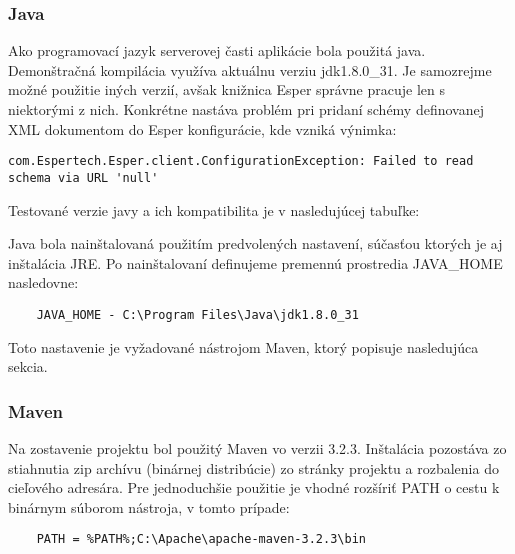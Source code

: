 \subsubsection{Java}	%
	Ako programovací jazyk serverovej časti aplikácie bola použitá java. Demonštračná kompilácia využíva aktuálnu verziu jdk1.8.0\_31. Je samozrejme možné použitie iných verzií, avšak knižnica Esper správne pracuje len s niektorými z nich. Konkrétne nastáva problém pri pridaní schémy definovanej XML dokumentom do Esper konfigurácie, kde vzniká výnimka:
	\begin{lstlisting}[label=lst:exjava,caption=Výnimka pri definovaní XML schémy v niektorých verziách javy]
	com.Espertech.Esper.client.ConfigurationException: Failed to read schema via URL 'null'
	\end{lstlisting}
	
	Testované verzie javy a ich kompatibilita je v nasledujúcej tabuľke:
	
	Java bola nainštalovaná použitím predvolených nastavení, súčasťou ktorých je aj inštalácia JRE. Po nainštalovaní definujeme premennú prostredia JAVA\_HOME nasledovne:
	\begin{lstlisting}
	JAVA_HOME - C:\Program Files\Java\jdk1.8.0_31
	\end{lstlisting}
	Toto nastavenie je vyžadované nástrojom Maven, ktorý popisuje nasledujúca sekcia.
	
\subsubsection{Maven}	%
	Na zostavenie projektu bol použitý Maven vo verzii 3.2.3. Inštalácia pozostáva zo stiahnutia zip archívu (binárnej distribúcie) zo stránky projektu a rozbalenia do cieľového adresára. Pre jednoduchšie použitie je vhodné rozšíriť PATH o cestu k binárnym súborom nástroja, v tomto prípade:
	\begin{lstlisting}
	PATH = %PATH%;C:\Apache\apache-maven-3.2.3\bin
	\end{lstlisting}

